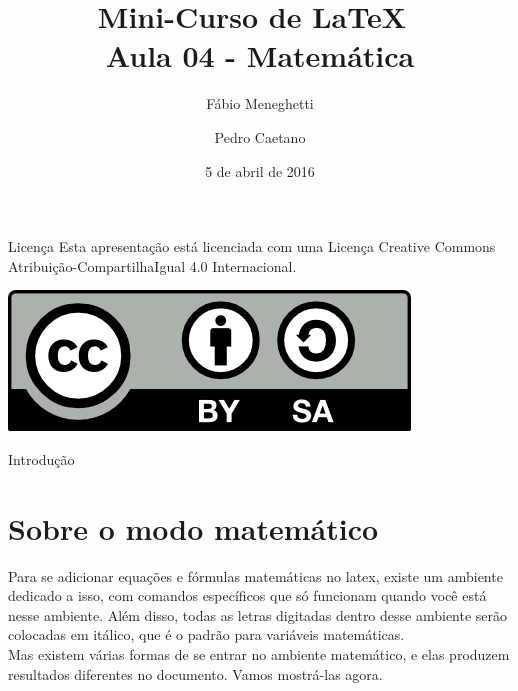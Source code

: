 \documentclass[12pt]{beamer}
\title{Mini-Curso de \LaTeX\ \\ Aula 04 - Matemática}
\author{Fábio Meneghetti \and Pedro Caetano}
\date{5 de abril de 2016}
\begin{document}
\begin{frame}
  \titlepage
\end{frame}

\begin{frame}{Licença}
  Esta apresentação está licenciada com uma Licença Creative Commons Atribuição-CompartilhaIgual 4.0 Internacional.
  \begin{center}
    \includegraphics[scale=0.3]{../license.png}
  \end{center}
\end{frame}

\begin{frame}
  \tableofcontents
\end{frame}

\begin{frame}{Introdução}
  \section{Sobre o modo matemático}
  Para se adicionar equações e fórmulas matemáticas no latex, existe um ambiente dedicado a isso, com comandos específicos que só funcionam quando você está nesse ambiente. Além disso, todas as letras digitadas dentro desse ambiente serão colocadas em itálico, que é o padrão para variáveis matemáticas.
  \\[1cm]
  Mas existem várias formas de se entrar no ambiente matemático, e elas produzem resultados diferentes no documento. Vamos mostrá-las agora.
\end{frame}
\end{document}
